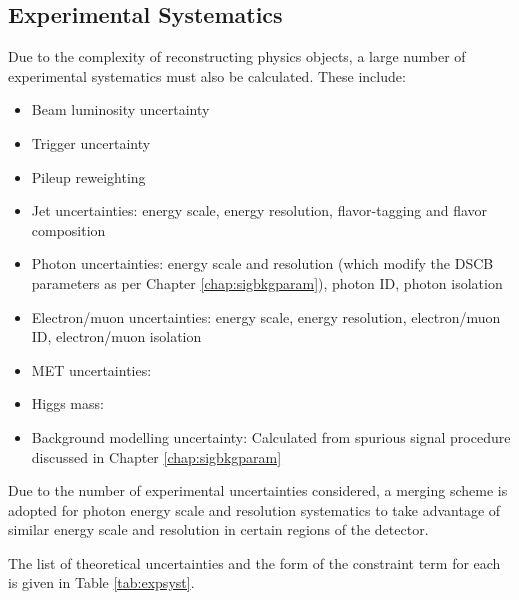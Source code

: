 \subsection{Experimental Systematics}

Due to the complexity of reconstructing physics objects, a large number of experimental systematics must also be calculated.
These include:

\begin{itemize}
\item Beam luminosity uncertainty \cite{ATLAS-CONF-2019-021}
\item Trigger uncertainty \cite{trigger} \cite{triggerperformance}
\item Pileup reweighting
\item Jet uncertainties: energy scale, energy resolution,  flavor-tagging and flavor composition \cite{jetuncs} \cite{jetuncs} \cite{jetuncs} \cite{jetuncs}
\item Photon uncertainties: energy scale and resolution (which modify the DSCB parameters as per Chapter \ref{chap:sigbkgparam}), photon ID, photon isolation \cite{CERN-EP-2019-145} \cite{photuncs}
\item Electron/muon uncertainties: energy scale, energy resolution, electron/muon ID, electron/muon isolation \cite{CERN-EP-2019-145} \cite{photuncs} \cite{elID-CERN-EP-2018-273} \cite{CERN-EP-2016-033}
\item MET uncertainties: \cite{MET1} \cite{MET2}
\item Higgs mass: \cite{Higgsmass}
\item Background modelling uncertainty: Calculated from spurious signal procedure discussed in Chapter \ref{chap:sigbkgparam}
\end{itemize}

Due to the number of experimental uncertainties considered, a merging scheme is adopted for photon energy scale and resolution systematics to take advantage of similar energy scale and resolution in certain regions of the detector.

The list of theoretical uncertainties and the form of the constraint term for each is given in Table \ref{tab:expsyst}.

